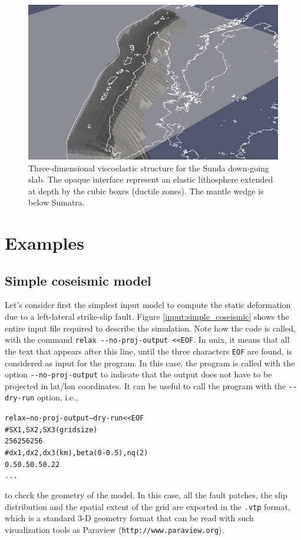 \documentclass[10pt]{article}
\begin{document}
%
\begin{figure}[h]
\centering
\includegraphics[width=\textwidth]{sunda.jpg}
\caption{\small Three-dimensional viscoelastic structure for the Sunda down-going slab. The opaque interface represent an elastic lithosphere extended at depth by the cubic boxes (ductile zones). The mantle wedge is below Sumatra.}
\label{fig:sunda}
\end{figure}
%



\pagebreak
\section{Examples}

\subsection{Simple coseismic model}

Let's consider first the simplest input model to compute the static deformation due to a left-lateral strike-slip fault. Figure \ref{input:simple_coseismic} shows the entire input file required to describe the simulation. Note how the code is called, with the command \verb'relax --no-proj-output <<EOF'. In unix, it means that all the text that appears after this line, until the three characters \verb'EOF' are found, is considered as input for the program. In this case, the program is called with the option \verb'--no-proj-output' to indicate that the output does not have to be projected in lat/lon coordinates. It can be useful to call the program with the \verb'--dry-run' option, i.e.,
\begin{alltt}
relax --no-proj-output {\color{orange}--dry-run} <<EOF
# SX1,SX2,SX3 (grid size)
256 256 256
# dx1,dx2,dx3 (km),beta (0-0.5),nq (2)
0.5 0.5 0.5 0.2 2
...
\end{alltt}
to check the geometry of the model. In this case, all the fault patches, the slip distribution and the spatial extent of the grid are exported in the \verb'.vtp' format, which is a standard 3-D geometry format that can be read with such visualization tools as Paraview (\verb'http://www.paraview.org').
\end{document}

